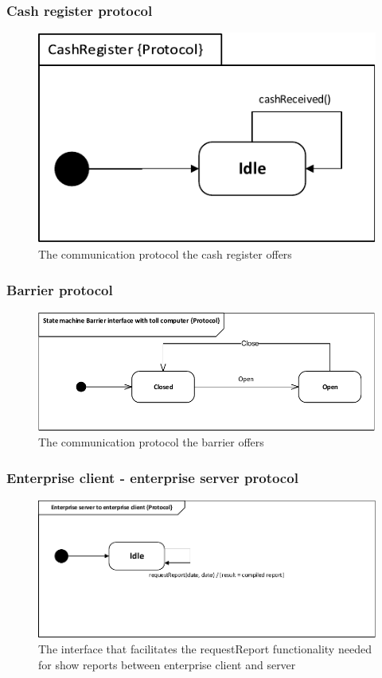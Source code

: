 \subsubsection*{Cash register protocol}
\begin{figure}[H]
\centering
\includegraphics[width=0.7\linewidth]{img/behaviour_state_machines/protocol_state_machines/protocol_state_machine_CR_TLC}
\caption{The communication protocol the cash register offers}
\label{fig:protocol_state_machine_CR_TLC}
\end{figure}

\subsubsection*{Barrier protocol}
\begin{figure}[H]
\centering
\includegraphics[width=0.7\linewidth]{img/behaviour_state_machines/protocol_state_machines/protocol_state_machine_barrier}
\caption{The communication protocol the barrier offers}
\label{fig:protocol_state_machine_barrier}
\end{figure}

\subsubsection*{Enterprise client - enterprise server protocol}
\begin{figure}[H]
\centering
\includegraphics[width=0.7\linewidth]{img/behaviour_state_machines/protocol_state_machines/protocol_state_machine_enterprise_server_to_enterprise_client}
\caption{The interface that facilitates the requestReport functionality needed for show reports between enterprise client and server}
\label{fig:protocol_state_machine_enterprise_server_to_enterprise_client}
\end{figure}


